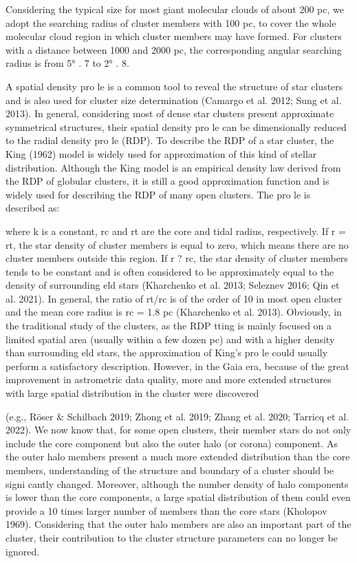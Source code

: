 \documentclass[../main.tex]{subfiles}
\begin{document}
{Considering the
typical size for most giant molecular clouds of about 200 pc,
we adopt the searching radius of cluster members with 100 pc, to cover the whole molecular cloud region in which cluster
members may have formed. For clusters with a distance
between 1000 and 2000 pc, the corresponding angular
searching radius is from 5° . 7 to 2° . 8.


A spatial density pro le is a common tool to reveal the
structure of star clusters and is also used for cluster size
determination (Camargo et al. 2012; Sung et al. 2013). In
general, considering most of dense star clusters present
approximate symmetrical structures, their spatial density pro le
can be dimensionally reduced to the radial density pro le
(RDP). To describe the RDP of a star cluster, the King (1962)
model is widely used for approximation of this kind of stellar
distribution. Although the King model is an empirical density
law derived from the RDP of globular clusters, it is still a good
approximation function and is widely used for describing the
RDP of many open clusters. The pro le is described as:

where k is a constant, rc and rt are the core and tidal radius,
respectively. If r = rt, the star density of cluster members is
equal to zero, which means there are no cluster members
outside this region. If r ? rc, the star density of cluster
members tends to be constant and is often considered to be
approximately equal to the density of surrounding eld stars
(Kharchenko et al. 2013; Seleznev 2016; Qin et al. 2021). In
general, the ratio of rt/rc is of the order of 10 in most open
cluster and the mean core radius is rc
= 1.8 pc (Kharchenko
et al. 2013). Obviously, in the traditional study of the clusters,
as the RDP tting is mainly focused on a limited spatial area
(usually within a few dozen pc) and with a higher density than
surrounding eld stars, the approximation of King’s pro le
could usually perform a satisfactory description.
However, in the Gaia era, because of the great improvement
in astrometric data quality, more and more extended structures
with large spatial distribution in the cluster were discovered

(e.g., Röser & Schilbach 2019; Zhong et al. 2019; Zhang et al.
2020; Tarricq et al. 2022). We now know that, for some open
clusters, their member stars do not only include the core
component but also the outer halo (or corona) component. As
the outer halo members present a much more extended
distribution than the core members, understanding of the
structure and boundary of a cluster should be signi cantly
changed. Moreover, although the number density of halo
components is lower than the core components, a large spatial
distribution of them could even provide a 10 times larger
number of members than the core stars (Kholopov 1969).
Considering that the outer halo members are also an important
part of the cluster, their contribution to the cluster structure
parameters can no longer be ignored.

}
\end{document}

